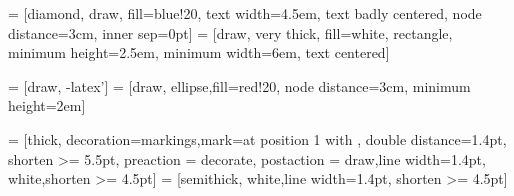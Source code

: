 \usepackage{tocloft}
\usepackage{xpatch}

\usepackage{algorithm}
\usepackage{algorithmic}
\usepackage{amssymb}
\usepackage{amsthm} 
\usepackage{graphicx}
\usepackage{wrapfig}
\usepackage{blkarray, bigstrut}
\usepackage{bm}
\usepackage{ stmaryrd } 
\usepackage{romannum}
\usepackage[normalem]{ulem}

\usepackage{mathpartir}
\usepackage{color}
\usepackage{subcaption} 
\usepackage{mathtools}
\DeclarePairedDelimiter{\ceil}{\lceil}{\rceil}
\DeclarePairedDelimiter{\floor}{\lfloor}{\rfloor}



\usepackage{tikz}
\usetikzlibrary{shapes,arrows,snakes,decorations.markings}
\usetikzlibrary{svg.path,arrows.meta, calc} 

 = [diamond, draw, fill=blue!20, 
    text width=4.5em, text badly centered, node distance=3cm, inner sep=0pt]
 = [draw, very thick, fill=white, rectangle, 
    minimum height=2.5em, minimum width=6em, text centered]

 = [draw, -latex']
 = [draw, ellipse,fill=red!20, node distance=3cm,    minimum height=2em]

 = [thick, decoration={markings,mark=at position
   1 with {}},
   double distance=1.4pt, shorten >= 5.5pt,
   preaction = {decorate},
   postaction = {draw,line width=1.4pt, white,shorten >= 4.5pt}]
 = [semithick, white,line width=1.4pt, shorten >= 4.5pt]

\usepackage{multirow}


\usepackage{listings}
\usepackage{xcolor}


\lstset{style=mystyle}



\usepackage{xargs}
\usepackage{cleveref}
